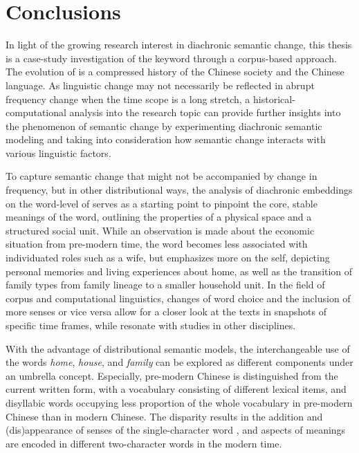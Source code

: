 

\chapter{Conclusions}
\label{conclusions}

In light of the growing research interest in diachronic semantic change, this thesis is a case-study investigation of the keyword \jia through a corpus-based approach. The evolution of \jia is a compressed history of the Chinese society and the Chinese language. As linguistic change may not necessarily be reflected in abrupt frequency change when the time scope is a long stretch, a historical-computational analysis into the research topic can provide further insights into the phenomenon of semantic change by experimenting diachronic semantic modeling and taking into consideration how semantic change interacts with various linguistic factors.

To capture semantic change that might not be accompanied by change in frequency, but in other distributional ways, the analysis of diachronic embeddings on the word-level of \jia serves as a starting point to pinpoint the core, stable meanings of the word, outlining the properties of a physical space and a structured social unit. While an observation is made about the economic situation from pre-modern time, the word \jia becomes less associated with individuated roles such as a wife, but emphasizes more on the self, depicting personal memories and living experiences about home, as well as the transition of family types from family lineage to a smaller household unit. In the field of corpus and computational linguistics, changes of word choice and the inclusion of more senses or vice versa allow for a closer look at the texts in snapshots of specific time frames, while resonate with studies in other disciplines.

With the advantage of distributional semantic models, the interchangeable use of the words \textit{home}, \textit{house}, and \textit{family} can be explored as different components under an umbrella concept. Especially, pre-modern Chinese is distinguished from the current written form, with a vocabulary consisting of different lexical items, and disyllabic words occupying less proportion of the whole vocabulary in pre-modern Chinese than in modern Chinese. The disparity results in the addition and (dis)appearance of senses of the single-character word \jia\rspace , and aspects of meanings are encoded in different two-character words in the modern time.

